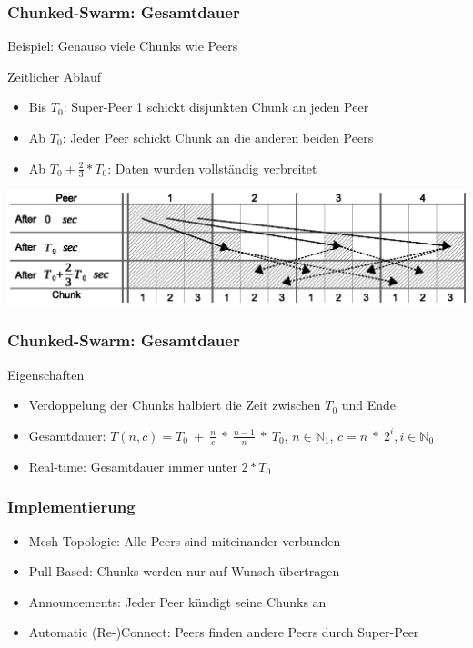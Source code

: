\begin{frame}
  \frametitle{Chunked-Swarm: Gesamtdauer}
  Beispiel: Genauso viele Chunks wie Peers
  \begin{exampleblock}{Zeitlicher Ablauf}
    \begin{itemize}
      \item Bis $T_0$: Super-Peer 1 schickt disjunkten Chunk an jeden Peer
      \item Ab $T_0$: Jeder Peer schickt Chunk an die anderen beiden Peers
      \item Ab $T_0 + \frac{2}{3} * T_0$: Daten wurden vollständig verbreitet
    \end{itemize}
  \end{exampleblock}
  \begin{center}
    \includegraphics[width=1\textwidth]{fig/chunkedswarmformula1.eps}
  \end{center}
\end{frame}


\begin{frame}
  \frametitle{Chunked-Swarm: Gesamtdauer}
  \begin{block}{Eigenschaften}
    \begin{itemize}  
      \item Verdoppelung der Chunks halbiert die Zeit zwischen $T_0$ und Ende
      \vspace{2mm}
      \item Gesamtdauer: $T(n, c) = T_0\:+\:\frac{n}{c}\:*\:\frac{n-1}{n}\:*\:T_0$, $n \in \mathbb{N}_1$, $c = n\:*\:2^i, i \in \mathbb{N}_0$
      \vspace{2mm}
      \item Real-time: Gesamtdauer immer unter $2 * T_0$
    \end{itemize}
  \end{block}
\end{frame}


\begin{frame}
  \frametitle{Implementierung}
  \begin{itemize}  
    \item Mesh Topologie: Alle Peers sind miteinander verbunden
    \vspace{1mm}
    \item Pull-Based: Chunks werden nur auf Wunsch übertragen
    \vspace{1mm}
    \item Announcements: Jeder Peer kündigt seine Chunks an
    \vspace{1mm}
    \item Automatic (Re-)Connect: Peers finden andere Peers durch Super-Peer
  \end{itemize} 
\end{frame}


